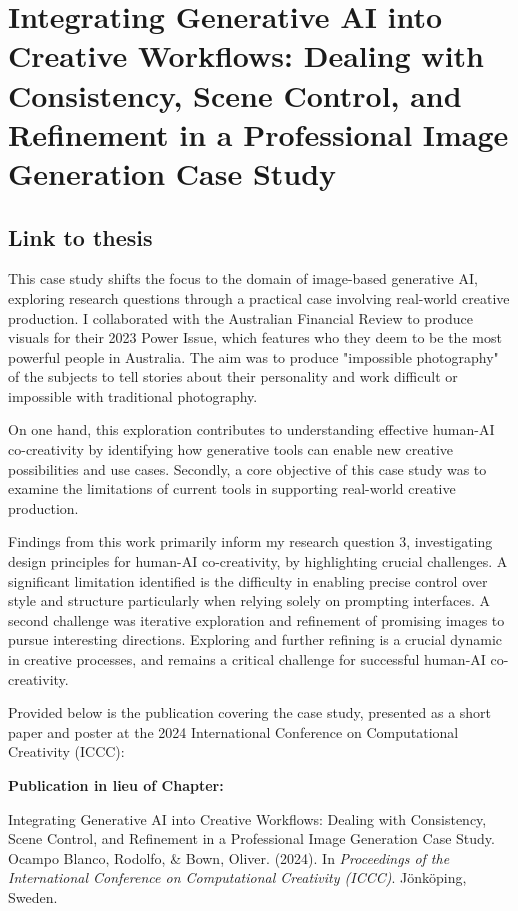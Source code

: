 \chapter{Integrating Generative AI into Creative Workflows: Dealing with Consistency, Scene Control, and Refinement in a Professional Image Generation Case Study} \label{c:tc6} 

\section{Link to thesis}

This case study shifts the focus to the domain of image-based generative AI, exploring research questions through a practical case involving real-world creative production. I collaborated with the Australian Financial Review to produce visuals for their 2023 Power Issue, which features who they deem to be the most powerful people in Australia. The aim was to produce "impossible photography" of the subjects to tell stories about their personality and work difficult or impossible with traditional photography. 

On one hand, this exploration contributes to understanding effective human-AI co-creativity by identifying how generative tools can enable new creative possibilities and use cases. Secondly, a core objective of this case study was to examine the limitations of current tools in supporting real-world creative production. 

Findings from this work primarily inform my research question 3, investigating design principles for human-AI co-creativity, by highlighting crucial challenges. A significant limitation identified is the difficulty in enabling precise control over style and structure particularly when relying solely on prompting interfaces. A second challenge was iterative exploration and refinement of promising images to pursue interesting directions. Exploring and further refining is a crucial dynamic in creative processes, and remains a critical challenge for successful human-AI co-creativity.

Provided below is the publication covering the case study, presented as a short paper and poster at the 2024 International Conference on Computational Creativity (ICCC):

\textbf{Publication in lieu of Chapter:}


Integrating Generative AI into Creative Workflows: Dealing with Consistency, Scene Control, and Refinement in a Professional Image Generation Case Study. Ocampo Blanco, Rodolfo, \& Bown, Oliver. (2024). In \textit{Proceedings of the International Conference on Computational Creativity (ICCC)}. Jönköping, Sweden. 



